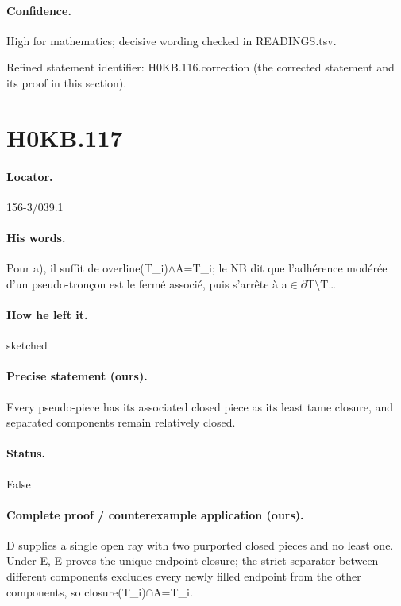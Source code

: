 \paragraph{Confidence.} High for mathematics; decisive wording checked in READINGS.tsv.

\noindent Refined statement identifier: H0KB.116.correction (the corrected statement and its proof in this section).

\section*{H0KB.117}\label{statement:H0KB.117}
\paragraph{Locator.} 156-3/039.1

\paragraph{His words.} Pour a), il suffit de overline(T\_i)\ensuremath{\wedge}A=T\_i; le NB dit que l’adhérence modérée d’un pseudo-tronçon est le fermé associé, puis s’arrête à a\ensuremath{\in}\ensuremath{\partial}T\ensuremath{\setminus}T…

\paragraph{How he left it.} sketched

\paragraph{Precise statement (ours).} Every pseudo-piece has its associated closed piece as its least tame closure, and separated components remain relatively closed.

\paragraph{Status.} False

\paragraph{Complete proof / counterexample application (ours).} D supplies a single open ray with two purported closed pieces and no least one. Under E, E proves the unique endpoint closure; the strict separator between different components excludes every newly filled endpoint from the other components, so closure(T\_i)\ensuremath{\cap}A=T\_i.

